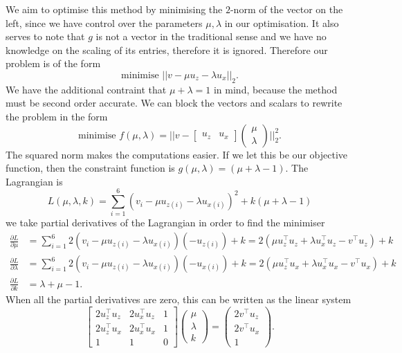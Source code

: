 We aim to optimise this method by minimising the $2$-norm of the vector on the left, since we have control over the parameters $\mu, \lambda$ in our optimisation.
It also serves to note that $g$ is not a vector in the traditional sense and we have no knowledge on the scaling of its entries, therefore it is ignored.
Therefore our problem is of the form
\begin{equation*}
    \text{minimise } ||v - \mu u_z - \lambda u_x||_2.
\end{equation*}
We have the additional contraint that $\mu + \lambda = 1$ in mind, because the method must be second order accurate.
We can block the vectors and scalars to rewrite the problem in the form
\begin{equation*}
    \text{minimise } f(\mu, \lambda) = || v - \begin{bmatrix}
        u_z & u_x
    \end{bmatrix} \begin{pmatrix}
        \mu \\
        \lambda
    \end{pmatrix} ||_2^2.
\end{equation*}
The squared norm makes the computations easier.
If we let this be our objective function, then the constraint function is $g(\mu, \lambda) = (\mu + \lambda - 1)$.
The Lagrangian is
\begin{equation*}
    L(\mu, \lambda, k) = \sum_{i=1}^{6} (v_i - \mu u_{z(i)} - \lambda u_{x(i)})^2 + k (\mu + \lambda - 1)
\end{equation*}
we take partial derivatives of the Lagrangian in order to find the minimiser
\begin{align*}
    \frac{\partial L}{\partial \mu} &= \sum_{i=1}^{6} 2(v_i - \mu u_{z(i)} - \lambda u_{x(i)})(-u_{z(i)}) + k = 2 (\mu u_z^\top u_z + \lambda u_x^\top u_z - v^\top u_z ) + k \\
    \frac{\partial L}{\partial \lambda} &= \sum_{i=1}^{6} 2(v_i - \mu u_{z(i)} - \lambda u_{x(i)})(-u_{x(i)}) + k =  2 (\mu u_z^\top u_x + \lambda u_x^\top u_x - v^\top u_x ) + k \\
    \frac{\partial L}{\partial k} &= \lambda + \mu - 1.
\end{align*}
When all the partial derivatives are zero, this can be written as the linear system
\begin{equation*}
    \begin{bmatrix}
        2u_z^\top u_z & 2u_x^\top u_z & 1 \\
        2u_z^\top u_x & 2u_x^\top u_x & 1 \\
        1 & 1 & 0
    \end{bmatrix} \begin{pmatrix}
        \mu \\
        \lambda \\
        k
    \end{pmatrix} = \begin{pmatrix}
        2v^\top u_z \\
        2v^\top u_x \\
        1
    \end{pmatrix}.
\end{equation*}

